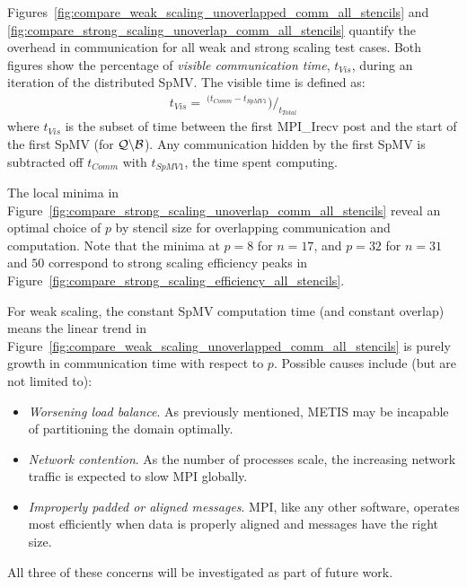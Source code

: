 \documentclass{report}
\begin{document}
Figures~\ref{fig:compare_weak_scaling_unoverlapped_comm_all_stencils} and \ref{fig:compare_strong_scaling_unoverlap_comm_all_stencils}  quantify the overhead in communication for all weak and strong scaling test cases. Both figures show the percentage of \emph{visible communication time}, $t_{Vis}$, during an iteration of the distributed SpMV. The visible time is defined as: 
\begin{align*}
t_{Vis} = \ ^{(t_{Comm} - t_{SpMV 1}}) /_{t_{Total}}
\end{align*}
where $t_{Vis}$ is the subset of time between the first MPI\_Irecv post and the start of the first SpMV (for $\mathcal{Q} \backslash \mathcal{B}$). Any communication hidden by the first SpMV is subtracted off $t_{Comm}$ with $t_{SpMV 1}$, the time spent computing.

The local minima in  Figure~\ref{fig:compare_strong_scaling_unoverlap_comm_all_stencils} reveal an optimal choice of $p$ by stencil size for overlapping communication and computation. Note that the minima at $p=8$ for $n=17$, and $p=32$ for $n=31$ and $50$ correspond to strong scaling efficiency peaks in Figure~\ref{fig:compare_strong_scaling_efficiency_all_stencils}.

 For weak scaling, the constant SpMV computation time (and constant overlap) means the linear trend in Figure~\ref{fig:compare_weak_scaling_unoverlapped_comm_all_stencils}  is purely growth in communication time with respect to $p$. Possible causes include (but are not limited to): 
\begin{itemize}
\item \emph{Worsening load balance}. As previously mentioned, METIS may be incapable of partitioning the domain optimally.
\item \emph{Network contention}. As the number of processes scale, the increasing network traffic is expected to slow MPI globally.  
\item \emph{Improperly padded or aligned messages}. MPI, like any other software, operates most efficiently when data is properly aligned and messages have the right size. 
\end{itemize}
All three of these concerns will be investigated as part of future work. 

%
\end{document}
